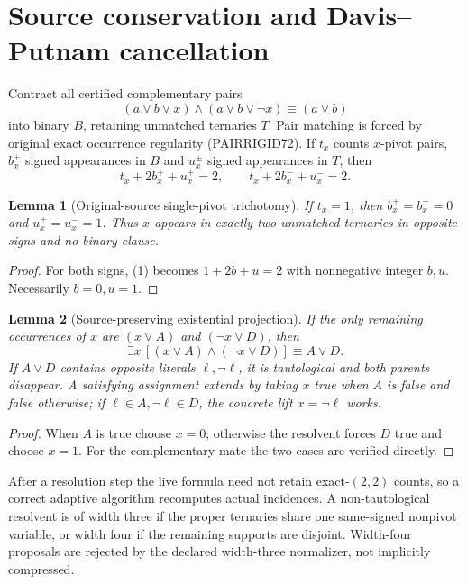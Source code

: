\documentclass[11pt]{article}
\newtheorem{lemma}{Lemma}
\begin{document}
\section{Source conservation and Davis--Putnam cancellation}
Contract all certified complementary pairs
\[
(a\vee b\vee x)\wedge(a\vee b\vee\neg x)\equiv(a\vee b)
\]
into binary $B$, retaining unmatched ternaries $T$. Pair matching is forced by original exact occurrence regularity (PAIRRIGID72). If $t_x$ counts $x$-pivot pairs, $b_x^\pm$ signed appearances in $B$ and $u_x^\pm$ signed appearances in $T$, then
\[
 t_x+2b_x^++u_x^+=2,\qquad
 t_x+2b_x^-+u_x^-=2. \tag{1}
\]
\begin{lemma}[Original-source single-pivot trichotomy]
If $t_x=1$, then $b_x^+=b_x^-=0$ and $u_x^+=u_x^-=1$. Thus $x$ appears in exactly two unmatched ternaries in opposite signs and no binary clause.
\end{lemma}
\begin{proof}
For both signs, (1) becomes $1+2b+u=2$ with nonnegative integer $b,u$. Necessarily $b=0,u=1$.
\end{proof}
\begin{lemma}[Source-preserving existential projection]
If the only remaining occurrences of $x$ are $(x\vee A)$ and $(\neg x\vee D)$, then
\[
\exists x\,[(x\vee A)\wedge(\neg x\vee D)]\equiv A\vee D. \tag{2}
\]
If $A\vee D$ contains opposite literals $\ell,\neg\ell$, it is tautological and both parents disappear. A satisfying assignment extends by taking $x$ true when $A$ is false and false otherwise; if $\ell\in A,\neg\ell\in D$, the concrete lift $x=\neg\ell$ works.
\end{lemma}
\begin{proof}
When $A$ is true choose $x=0$; otherwise the resolvent forces $D$ true and choose $x=1$. For the complementary mate the two cases are verified directly.
\end{proof}
After a resolution step the live formula need not retain exact-$(2,2)$ counts, so a correct adaptive algorithm recomputes actual incidences. A non-tautological resolvent is of width three if the proper ternaries share one same-signed nonpivot variable, or width four if the remaining supports are disjoint. Width-four proposals are rejected by the declared width-three normalizer, not implicitly compressed.
\end{document}

